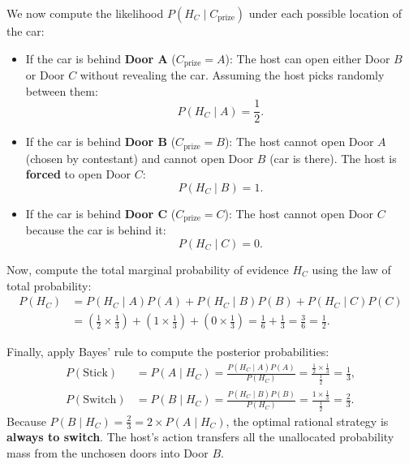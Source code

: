 We now compute the likelihood $P(H_C \mid C_{\text{prize}})$ under each possible location of the car:
\begin{itemize}[noitemsep]
  \item If the car is behind \textbf{Door A} ($C_{\text{prize}} = A$): The host can open either Door $B$ or Door $C$ without revealing the car. Assuming the host picks randomly between them:
  \begin{equation}
  P(H_C \mid A) = \frac{1}{2}.
  \end{equation}
  \item If the car is behind \textbf{Door B} ($C_{\text{prize}} = B$): The host cannot open Door $A$ (chosen by contestant) and cannot open Door $B$ (car is there). The host is \textbf{forced} to open Door $C$:
  \begin{equation}
  P(H_C \mid B) = 1.
  \end{equation}
  \item If the car is behind \textbf{Door C} ($C_{\text{prize}} = C$): The host cannot open Door $C$ because the car is behind it:
  \begin{equation}
  P(H_C \mid C) = 0.
  \end{equation}
\end{itemize}

Now, compute the total marginal probability of evidence $H_C$ using the law of total probability:
\begin{align}
P(H_C) &= P(H_C \mid A)P(A) + P(H_C \mid B)P(B) + P(H_C \mid C)P(C) \nonumber \\
&= \left(\frac{1}{2} \times \frac{1}{3}\right) + \left(1 \times \frac{1}{3}\right) + \left(0 \times \frac{1}{3}\right) = \frac{1}{6} + \frac{1}{3} = \frac{3}{6} = \frac{1}{2}.
\end{align}

Finally, apply Bayes' rule to compute the posterior probabilities:
\begin{align}
P(\text{Stick}) &= P(A \mid H_C) = \frac{P(H_C \mid A)P(A)}{P(H_C)} = \frac{\frac{1}{2} \times \frac{1}{3}}{\frac{1}{2}} = \frac{1}{3}, \\
P(\text{Switch}) &= P(B \mid H_C) = \frac{P(H_C \mid B)P(B)}{P(H_C)} = \frac{1 \times \frac{1}{3}}{\frac{1}{2}} = \frac{2}{3}.
\end{align}
Because $P(B \mid H_C) = \frac{2}{3} = 2 \times P(A \mid H_C)$, the optimal rational strategy is \textbf{always to switch}. The host's action transfers all the unallocated probability mass from the unchosen doors into Door $B$.

